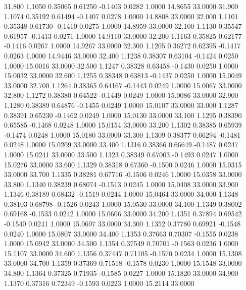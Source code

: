   31.800   1.1050   0.35065   0.61250  -0.1403   0.0282   1.0000  14.8655  33.0000
  31.900   1.1074   0.35192   0.61494  -0.1407   0.0278   1.0000  14.8808  33.0000
  32.000   1.1101   0.35348   0.61730  -0.1410   0.0275   1.0000  14.8959  33.0000
  32.100   1.1130   0.35547   0.61957  -0.1413   0.0271   1.0000  14.9110  33.0000
  32.200   1.1163   0.35825   0.62177  -0.1416   0.0267   1.0000  14.9267  33.0000
  32.300   1.1205   0.36272   0.62395  -0.1417   0.0263   1.0000  14.9446  33.0000
  32.400   1.1238   0.38307   0.63104  -0.1424   0.0250   1.0000  15.0016  33.0000
  32.500   1.1247   0.38328   0.63458  -0.1430   0.0250   1.0000  15.0032  33.0000
  32.600   1.1255   0.38348   0.63813  -0.1437   0.0250   1.0000  15.0049  33.0000
  32.700   1.1264   0.38365   0.64167  -0.1443   0.0249   1.0000  15.0067  33.0000
  32.800   1.1272   0.38380   0.64522  -0.1449   0.0249   1.0000  15.0086  33.0000
  32.900   1.1280   0.38389   0.64876  -0.1455   0.0249   1.0000  15.0107  33.0000
  33.000   1.1287   0.38391   0.65230  -0.1462   0.0249   1.0000  15.0130  33.0000
  33.100   1.1295   0.38390   0.65585  -0.1468   0.0248   1.0000  15.0154  33.0000
  33.200   1.1302   0.38385   0.65939  -0.1474   0.0248   1.0000  15.0180  33.0000
  33.300   1.1309   0.38377   0.66294  -0.1481   0.0248   1.0000  15.0209  33.0000
  33.400   1.1316   0.38366   0.66649  -0.1487   0.0247   1.0000  15.0241  33.0000
  33.500   1.1323   0.38349   0.67003  -0.1493   0.0247   1.0000  15.0276  33.0000
  33.600   1.1329   0.38318   0.67360  -0.1500   0.0246   1.0000  15.0315  33.0000
  33.700   1.1335   0.38281   0.67716  -0.1506   0.0246   1.0000  15.0358  33.0000
  33.800   1.1340   0.38239   0.68074  -0.1513   0.0245   1.0000  15.0408  33.0000
  33.900   1.1346   0.38189   0.68432  -0.1519   0.0244   1.0000  15.0464  33.0000
  34.000   1.1348   0.38103   0.68798  -0.1526   0.0243   1.0000  15.0530  33.0000
  34.100   1.1349   0.38002   0.69168  -0.1533   0.0242   1.0000  15.0606  33.0000
  34.200   1.1351   0.37894   0.69542  -0.1540   0.0241   1.0000  15.0697  33.0000
  34.300   1.1352   0.37780   0.69921  -0.1548   0.0240   1.0000  15.0807  33.0000
  34.400   1.1353   0.37663   0.70307  -0.1555   0.0238   1.0000  15.0942  33.0000
  34.500   1.1354   0.37549   0.70701  -0.1563   0.0236   1.0000  15.1107  33.0000
  34.600   1.1356   0.37447   0.71105  -0.1570   0.0234   1.0000  15.1308  33.0000
  34.700   1.1359   0.37369   0.71518  -0.1578   0.0230   1.0000  15.1548  33.0000
  34.800   1.1364   0.37325   0.71935  -0.1585   0.0227   1.0000  15.1820  33.0000
  34.900   1.1370   0.37316   0.72349  -0.1593   0.0223   1.0000  15.2114  33.0000
